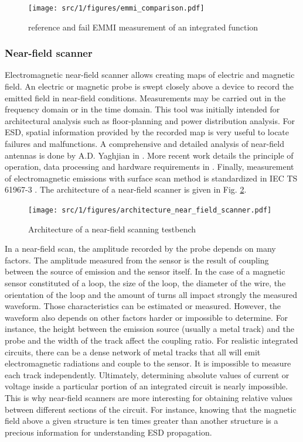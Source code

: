 \begin{figure}[!h]
  \centering
  \texttt{[image: src/1/figures/emmi\_comparison.pdf]}
  \caption{reference and fail EMMI measurement of an integrated function}
  \label{fig:emmi-examples}
\end{figure}

\subsubsection{Near-field scanner}
\label{sec:near-field-scan}

Electromagnetic near-field scanner allows creating maps of electric and magnetic field.
An electric or magnetic probe is swept closely above a device to record the emitted field in near-field conditions.
Measurements may be carried out in the frequency domain or in the time domain.
This tool was initially intended for architectural analysis such as floor-planning and power distribution analysis.
For ESD, spatial information provided by the recorded map is very useful to locate failures and malfunctions.
A comprehensive and detailed analysis of near-field antennas is done by A.D. Yaghjian in \cite{nfsFirstStudy}.
More recent work details the principle of operation, data processing and hardware requirements in \cite{near-field-scan, planarNFSAntenna, NFSMeasurements, NFScanner}.
Finally, measurement of electromagnetic emissions with surface scan method is standardized in IEC TS 61967-3 \cite{iec61967}.
The architecture of a near-field scanner is given in Fig. \ref{fig:near-field-scanner}.

\begin{figure}[!h]
  \centering
  \texttt{[image: src/1/figures/architecture\_near\_field\_scanner.pdf]}
  \caption{Architecture of a near-field scanning testbench}
  \label{fig:near-field-scanner}
\end{figure}

In a near-field scan, the amplitude recorded by the probe depends on many factors.
The amplitude measured from the sensor is the result of coupling between the source of emission and the sensor itself.
In the case of a magnetic sensor constituted of a loop, the size of the loop, the diameter of the wire, the orientation of the loop and the amount of turns all impact strongly the measured waveform.
Those characteristics can be estimated or measured.
However, the waveform also depends on other factors harder or impossible to determine.
For instance, the height between the emission source (usually a metal track) and the probe and the width of the track affect the coupling ratio.
For realistic integrated circuits, there can be a dense network of metal tracks that all will emit electromagnetic radiations and couple to the sensor.
It is impossible to measure each track independently.
Ultimately, determining absolute values of current or voltage inside a particular portion of an integrated circuit is nearly impossible.
This is why near-field scanners are more interesting for obtaining relative values between different sections of the circuit.
For instance, knowing that the magnetic field above a given structure is ten times greater than another structure is a precious information for understanding ESD propagation.

